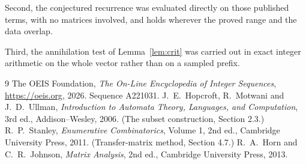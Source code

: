\documentclass[11pt,a4paper]{article}
\theoremstyle{plain}
\theoremstyle{definition}
\begin{document}
Second, the conjectured recurrence was evaluated directly on those published terms, with no
matrices involved, and holds wherever the proved range and the data overlap.

Third, the annihilation test of Lemma~\ref{lem:crit} was carried out in exact integer
arithmetic on the whole vector rather than on a sampled prefix.

\begin{thebibliography}{9}
 The OEIS Foundation, \emph{The On-Line Encyclopedia of Integer
Sequences}, \url{https://oeis.org}, 2026. Sequence A221031.
 J.~E.~Hopcroft, R.~Motwani and J.~D.~Ullman, \emph{Introduction to Automata
Theory, Languages, and Computation}, 3rd ed., Addison--Wesley, 2006. (The subset
construction, Section 2.3.)
 R.~P.~Stanley, \emph{Enumerative Combinatorics}, Volume 1, 2nd ed.,
Cambridge University Press, 2011. (Transfer-matrix method, Section 4.7.)
 R.~A.~Horn and C.~R.~Johnson, \emph{Matrix Analysis}, 2nd ed., Cambridge
University Press, 2013.
\end{thebibliography}
\end{document}
